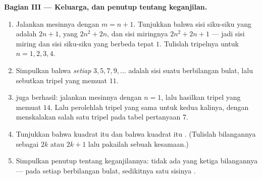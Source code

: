 \begin{problem}[{Soal akhir pekan --- segitiga siku-siku berbilangan
bulat, dan kesamaan $(m^2 - n^2)^2 + (2mn)^2 = (m^2 + n^2)^2$ yang
membangkitkan semuanya}]
\medskip
\noindent\textbf{Bagian III --- Keluarga, dan penutup tentang keganjilan.}
\begin{enumerate}[resume]
  \item Jalankan mesinnya dengan $m = n + 1$. Tunjukkan bahwa sisi
        siku-siku yang  adalah $2n + 1$, yang 
        $2n^2 + 2n$, dan sisi miringnya
        $2n^2 + 2n + 1$ --- jadi sisi miring dan sisi siku-siku yang
         berbeda tepat $1$. Tulislah tripelnya untuk
        $n = 1, 2, 3, 4$.
  \item Simpulkan bahwa \emph{setiap} 
        $3, 5, 7, 9, \dots$ adalah sisi suatu 
        berbilangan bulat, lalu sebutkan tripel yang memuat $11$.
  \item {} juga berhasil: jalankan mesinnya dengan
        $n = 1$, lalu hasilkan tripel yang memuat $14$. Lalu
        perolehlah tripel yang sama untuk kedua kalinya, dengan
        menskalakan salah satu tripel pada tabel pertanyaan 7.
  \item Tunjukkan bahwa kuadrat  itu  dan bahwa
        kuadrat  itu . (Tulislah bilangannya
        sebagai $2k$ atau $2k + 1$ lalu pakailah sebuah kesamaan.)
  \item Simpulkan penutup tentang keganjilannya: tidak ada  yang ketiga bilangannya  --- pada setiap
         berbilangan bulat, sedikitnya satu sisinya
        .

\end{enumerate}
\end{problem}

